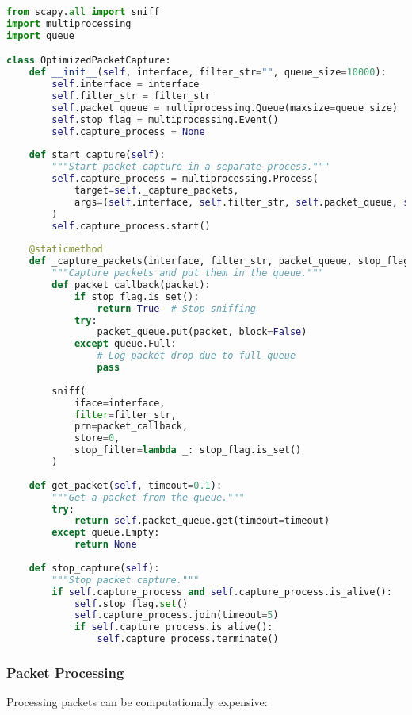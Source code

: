 \begin{lstlisting}[language=python, caption=Optimized Packet Capture]
from scapy.all import sniff
import multiprocessing
import queue

class OptimizedPacketCapture:
    def __init__(self, interface, filter_str="", queue_size=10000):
        self.interface = interface
        self.filter_str = filter_str
        self.packet_queue = multiprocessing.Queue(maxsize=queue_size)
        self.stop_flag = multiprocessing.Event()
        self.capture_process = None
        
    def start_capture(self):
        """Start packet capture in a separate process."""
        self.capture_process = multiprocessing.Process(
            target=self._capture_packets,
            args=(self.interface, self.filter_str, self.packet_queue, self.stop_flag)
        )
        self.capture_process.start()
        
    @staticmethod
    def _capture_packets(interface, filter_str, packet_queue, stop_flag):
        """Capture packets and put them in the queue."""
        def packet_callback(packet):
            if stop_flag.is_set():
                return True  # Stop sniffing
            try:
                packet_queue.put(packet, block=False)
            except queue.Full:
                # Log packet drop due to full queue
                pass
            
        sniff(
            iface=interface,
            filter=filter_str,
            prn=packet_callback,
            store=0,
            stop_filter=lambda _: stop_flag.is_set()
        )
        
    def get_packet(self, timeout=0.1):
        """Get a packet from the queue."""
        try:
            return self.packet_queue.get(timeout=timeout)
        except queue.Empty:
            return None
            
    def stop_capture(self):
        """Stop packet capture."""
        if self.capture_process and self.capture_process.is_alive():
            self.stop_flag.set()
            self.capture_process.join(timeout=5)
            if self.capture_process.is_alive():
                self.capture_process.terminate()
\end{lstlisting}

\subsubsection{Packet Processing}
Processing packets can be computationally expensive:

